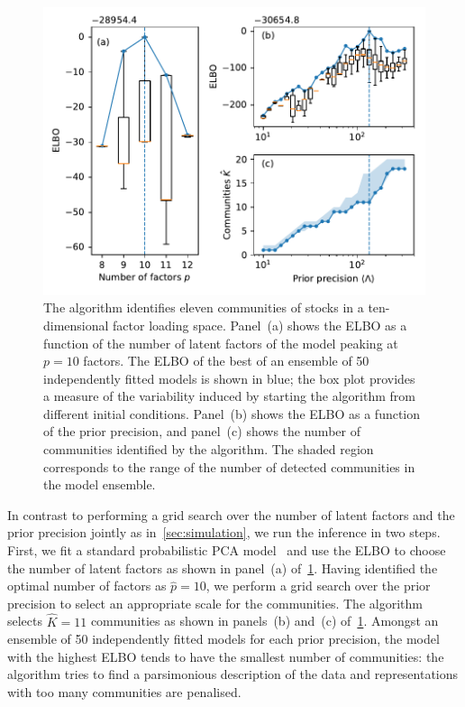 \documentclass[onecolumn,pre,superscriptaddress, longbibliography, nofootinbib, notitlepage]{revtex4-1}
\begin{document}
\begin{figure}
    \includegraphics{sp100-sweep.pdf}
    \caption{\label{fig:sp100-sweep} The algorithm identifies eleven communities of stocks in a ten-dimensional factor loading space. Panel~(a) shows the ELBO as a function of the number of latent factors of the model peaking at $p=10$ factors. The ELBO of the best of an ensemble of 50 independently fitted models is shown in blue; the box plot provides a measure of the variability induced by starting the algorithm from different initial conditions. Panel~(b) shows the ELBO as a function of the prior precision, and panel~(c) shows the number of communities identified by the algorithm. The shaded region corresponds to the range of the number of detected communities in the model ensemble.}
\end{figure}


In contrast to performing a grid search over the number of latent factors and the prior precision jointly as in~\cref{sec:simulation}, we run the inference in two steps. First, we fit a standard probabilistic PCA model~\cite{Tipping1999a} and use the ELBO to choose the number of latent factors as shown in panel~(a) of~\cref{fig:sp100-sweep}. Having identified the optimal number of factors as $\hat p=10$, we perform a grid search over the prior precision to select an appropriate scale for the communities. The algorithm selects $\hat K=11$ communities as shown in panels~(b) and~(c) of~\cref{fig:sp100-sweep}. Amongst an ensemble of 50 independently fitted models for each prior precision, the model with the highest ELBO tends to have the smallest number of communities: the algorithm tries to find a parsimonious description of the data and representations with too many communities are penalised. 
\end{document}
